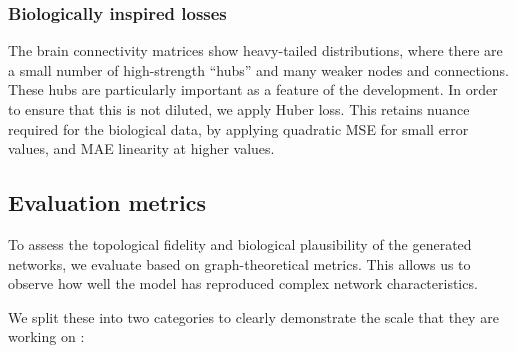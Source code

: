 \documentclass[sigconf, review]{acmart}
\begin{document}
\subsubsection{Biologically inspired losses}

The brain connectivity matrices show heavy-tailed distributions, where there are a small number of high-strength ``hubs'' and many weaker nodes and connections. These hubs are particularly important as a feature of the development. In order to ensure that this is not diluted, we apply Huber loss. This retains nuance required for the biological data, by applying quadratic MSE for small error values, and MAE linearity at higher values.


\subsection{Evaluation metrics}
To assess the topological fidelity and biological plausibility of the generated networks, we evaluate based on graph-theoretical metrics. This allows us to observe how well the model has reproduced complex network characteristics.

We split these into two categories to clearly demonstrate the scale that they are working on \cite{rubinov2010complex}:
\end{document}
